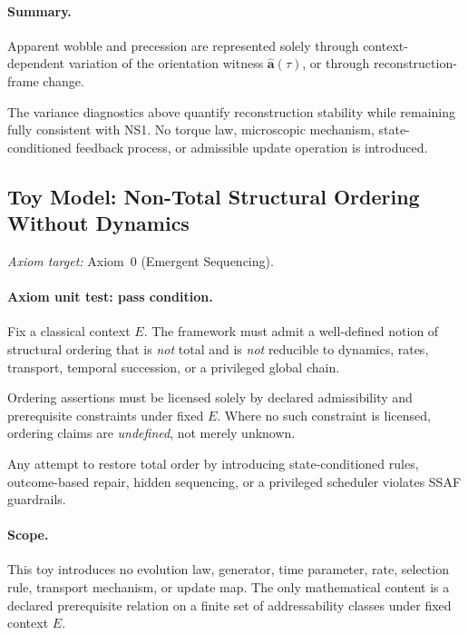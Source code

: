 \documentclass[aps,prx,onecolumn,11pt]{revtex4-2}
\theoremstyle{plain}
\theoremstyle{definition}
\theoremstyle{remark}
\begin{document}
\paragraph{Summary.}

Apparent wobble and precession are represented solely through
context-dependent variation of the orientation witness
\(\widehat{\mathbf a}(\tau)\), or through reconstruction-frame change.

The variance diagnostics above quantify reconstruction stability while
remaining fully consistent with NS1. No torque law, microscopic
mechanism, state-conditioned feedback process, or admissible update
operation is introduced.

\subsection{Toy Model: Non-Total Structural Ordering Without Dynamics}
\label{toy:nontotal_ordering}

\noindent\emph{Axiom target:} Axiom~0 (Emergent Sequencing).

\paragraph{Axiom unit test: pass condition.}

Fix a classical context \(E\). The framework must admit a well-defined
notion of structural ordering that is \emph{not} total and is
\emph{not} reducible to dynamics, rates, transport, temporal succession,
or a privileged global chain.

Ordering assertions must be licensed solely by declared admissibility
and prerequisite constraints under fixed \(E\). Where no such constraint
is licensed, ordering claims are \emph{undefined}, not merely unknown.

Any attempt to restore total order by introducing state-conditioned
rules, outcome-based repair, hidden sequencing, or a privileged
scheduler violates SSAF guardrails.

\paragraph{Scope.}

This toy introduces no evolution law, generator, time parameter, rate,
selection rule, transport mechanism, or update map. The only
mathematical content is a declared prerequisite relation on a finite set
of addressability classes under fixed context \(E\).
\end{document}
